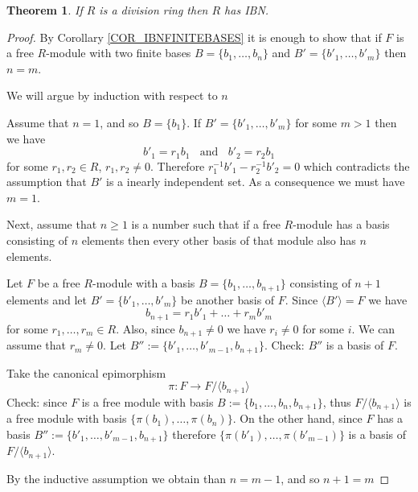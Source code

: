 \documentclass[12pt, letterpaper, oneside]{article}
\theoremstyle{plain}
\newtheorem{theorem}{Theorem}[section]
\theoremstyle{definition}
\newcommand{\subgp}[1]{\langle#1\rangle}
\newcommand{\vs}{\vskip 5mm}
\begin{document}
\vs\vs


\begin{theorem}
\label{THM_IBNDIVRINGS}
If $R$ is a division ring then $R$ has  IBN. 
\end{theorem}

\vs

\begin{proof}
By Corollary \ref{COR_IBNFINITEBASES} it is enough to show that if $F$ is a free $R$-module 
with two finite bases $B= \{b_{1}, \dots, b_{n}\}$ and $B'= \{b'_{1}, \dots, b'_{m}\}$ then 
$n=m$.

We will argue by induction with respect to $n$

Assume that  $n= 1$, and so $B= \{b_{1}\}$. If $B' = \{ b'_{1}, \dots, b'_{m}\}$ for some $m>1$ then we have 
$$b'_{1} = r_{1}b_{1} \ \ \ \ \text{and} \ \ \ \ b'_{2} = r_{2}b_{1}$$
for some $r_{1}, r_{2} \in R$, $r_{1}, r_{2}\neq 0$. Therefore $r^{-1}_{1}b'_{1} - r_{2}^{-1}b'_{2} = 0$ 
which contradicts the assumption that $B'$ is a inearly independent set. As a consequence we must have 
$m=1$.

\vs

Next, assume that  $n\geq 1$ is a number  such that if a free $R$-module has a basis consisting of 
$n$ elements then every other basis of that module also has $n$ elements. 

Let $F$ be a free $R$-module with a basis $B= \{b_{1}, \dots, b_{n+1}\}$ consisting of $n+1$
elements and let $B'= \{b'_{1}, \dots, b'_{m}\}$ be another basis of $F$. 
Since $\subgp{B'} = F$ we have
$$b_{n+1} = r_{1}b'_{1} + {\dots} + r_{m}b'_{m}$$
for some $r_{1}, \dots, r_{m}\in R$. Also, since $b_{n+1}\neq 0$ we have $r_{i}\neq 0$ for some $i$. 
We can assume that $r_{m}\neq 0$.  Let $B'' := \{b'_{1}, \dots, b'_{m-1}, b_{n+1}\}$. Check:
$B''$ is a basis of $F$. 

Take the canonical epimorphism
$$\pi\colon F \to F/\subgp{b_{n+1}}$$
Check: since  $F$ is a free module with basis $B := \{b_{1}, \dots, b_{n}, b_{n+1}\}$, thus 
$F/\subgp{b_{n+1}}$ is a free module with basis $\{ \pi(b_{1}), \dots, \pi(b_{n})\}$. On the other hand, 
since $F$ has a basis $B'' := \{b'_{1}, \dots, b'_{m-1}, b_{n+1}\}$ therefore 
$\{\pi(b'_{1}), \dots, \pi(b'_{m-1})\}$ is a basis of $F/\subgp{b_{n+1}}$. 

By the inductive assumption we obtain than $n= m-1$, and so $n+1 = m$


\end{proof}


\vs\vs
\end{document}
